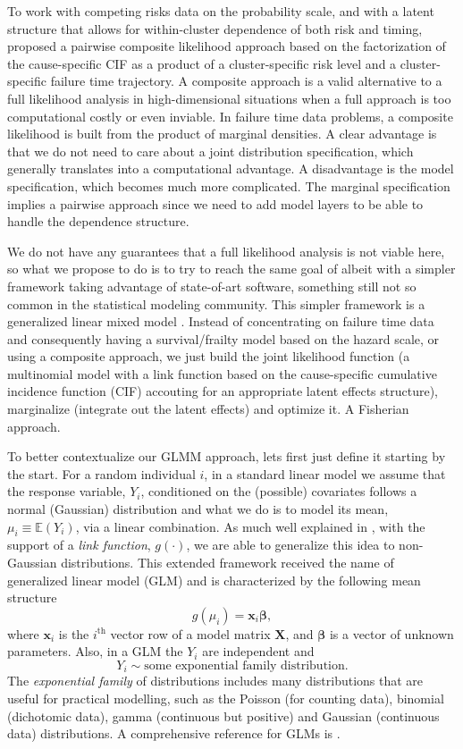 To work with competing risks data on the probability scale, and with a
latent structure that allows for within-cluster dependence of both risk
and timing,  proposed a pairwise composite
likelihood approach based on the factorization of the cause-specific CIF
as a product of a cluster-specific risk level and a cluster-specific
failure time trajectory. A composite approach \cite{lindsay88,
  cox&reid04, varin11} is a valid alternative to a full likelihood
analysis in high-dimensional situations when a full approach is too
computational costly or even inviable. In failure time data problems, a
composite likelihood is built from the product of marginal densities. A
clear advantage is that we do not need to care about a joint
distribution specification, which generally translates into a
computational advantage. A disadvantage is the model specification,
which becomes much more complicated. The marginal specification implies
a pairwise approach since we need to add model layers to be able to
handle the dependence structure.

We do not have any guarantees that a full likelihood analysis is not
viable here, so what we propose to do is to try to reach the same goal
of  albeit with a simpler framework taking advantage
of state-of-art software, something still not so common in the
statistical modeling community. This simpler framework is a generalized
linear mixed model \cite[GLMM]{GLMM}. Instead of concentrating on
failure time data and consequently having a survival/frailty model based
on the hazard scale, or using a composite approach, we just build the
joint likelihood function (a multinomial model with a link function
based on the cause-specific cumulative incidence function (CIF)
accouting for an appropriate latent effects structure), marginalize
(integrate out the latent effects) and optimize it. A Fisherian
approach.

To better contextualize our GLMM approach, lets first just define it
starting by the start. For a random individual \(i\), in a standard
linear model we assume that the response variable, \(Y_{i}\),
conditioned on the (possible) covariates follows a normal (Gaussian)
distribution and what we do is to model its mean, \(\mu_{i} \equiv
\mathbb{E}(Y_{i})\), via a linear combination. As much well explained in
, with the support of a \textit{link function},
\(g(\cdot)\), we are able to generalize this idea to non-Gaussian
distributions. This extended framework received the name of generalized
linear model (GLM) and is characterized by the following mean structure
\[
 g(\mu_{i}) = \bm{x}_{i}\bm{\beta},
\]
where \(\bm{x}_{i}\) is the \(i^\text{th}\) vector row of a model matrix
\(\bm{X}\), and \(\bm{\beta}\) is a vector of unknown parameters. Also,
in a GLM the \(Y_{i}\) are independent and
\[
  Y_{i} \sim \text{some exponential family distribution}.
\]
The \textit{exponential family} of distributions includes many
distributions that are useful for practical modelling, such as the
Poisson (for counting data), binomial (dichotomic data), gamma
(continuous but positive) and Gaussian (continuous data) distributions.
A comprehensive reference for GLMs is .

